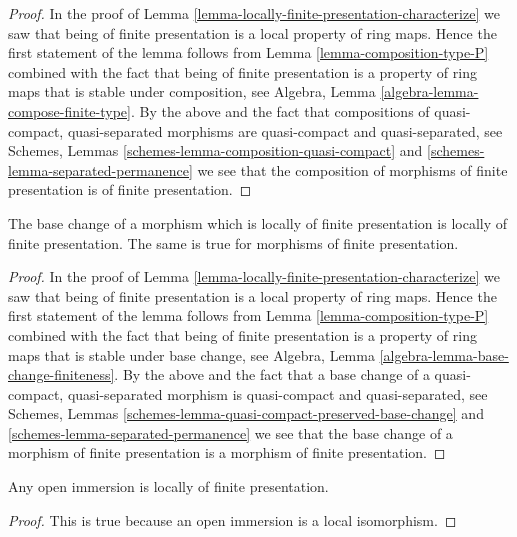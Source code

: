 \begin{proof}
In the proof of Lemma \ref{lemma-locally-finite-presentation-characterize}
we saw that being of finite presentation is a local property of ring maps.
Hence the first statement of the lemma follows from
Lemma \ref{lemma-composition-type-P} combined
with the fact that being of finite presentation
is a property of ring maps that is
stable under composition, see
Algebra, Lemma \ref{algebra-lemma-compose-finite-type}.
By the above and the fact that compositions of
quasi-compact, quasi-separated morphisms are
quasi-compact and quasi-separated, see
Schemes, Lemmas \ref{schemes-lemma-composition-quasi-compact}
and \ref{schemes-lemma-separated-permanence}
we see that the composition of morphisms of finite presentation is
of finite presentation.
\end{proof}

\begin{lemma}
\label{lemma-base-change-finite-presentation}
The base change of a morphism which is locally of finite presentation
is locally of finite presentation. The same is true for morphisms of
finite presentation.
\end{lemma}

\begin{proof}
In the proof of Lemma \ref{lemma-locally-finite-presentation-characterize}
we saw that being of finite presentation is a local property of ring maps.
Hence the first statement of the lemma follows from
Lemma \ref{lemma-composition-type-P} combined
with the fact that being of finite presentation
is a property of ring maps that is
stable under base change, see
Algebra, Lemma \ref{algebra-lemma-base-change-finiteness}.
By the above and the fact that a base change of a
quasi-compact, quasi-separated morphism is quasi-compact
and quasi-separated, see
Schemes, Lemmas \ref{schemes-lemma-quasi-compact-preserved-base-change}
and \ref{schemes-lemma-separated-permanence}
we see that the base change of a morphism of finite presentation is
a morphism of finite presentation.
\end{proof}

\begin{lemma}
\label{lemma-open-immersion-locally-finite-presentation}
Any open immersion is locally of finite presentation.
\end{lemma}

\begin{proof}
This is true because an open immersion is a local isomorphism.
\end{proof}

